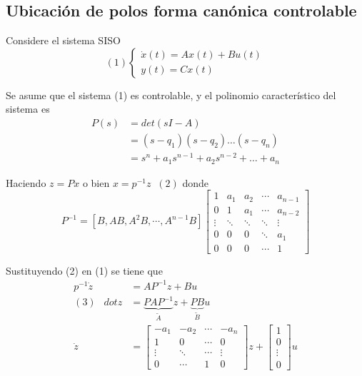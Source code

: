 \subsection{Ubicación de polos forma canónica controlable}

Considere el sistema SISO
\[(1)
    \left\{
        \begin{array}{lll}
            \dot{x}(t) = Ax(t) + Bu(t) \\
            y(t) = Cx(t)
        \end{array}
    \right.
\]

Se asume que el sistema (1) es controlable, y el polinomio característico del sistema es 
\[
    \begin{split}
        P(s) & = det(sI-A) \\
        & = (s-q_{1}) ( s-q_{2}) \ldots (s-q_{n}) \\
        & = s^{n} + a_{1}s^{n-1} + a_{2}s^{n-2} + \ldots + a_{n}
    \end{split}
\]

Haciendo \( z = Px \) o bien \( x=p^{-1}z \;\; (2) \) donde 
\[
    P^{-1} =
    [B, AB, A^{2}B, \cdots, A^{n-1}B ]
    \begin{bmatrix}
        1 & a_{1} & a_{2} & \cdots & a_{n-1} \\
        0 & 1 & a_{1} & \cdots & a_{n-2} \\
        \vdots & \ddots & \ddots & \ddots & \vdots \\
        0 & 0 & 0 & \ddots & a_{1} \\
        0 & 0 & 0 & \cdots & 1
    \end{bmatrix}
\]

Sustituyendo (2) en (1) se tiene que
\[
    \begin{split}
        p^{-1}\dot{z} & = AP^{-1}z + Bu \\
        (3) \;\;\ dot{z} & = 
        \underbrace{ PAP^{-1} }_{ \tilde{A} }
        z + 
        \underbrace{ PB }_{ \tilde{B} }u \\
        \dot{z} & = 
        \begin{bmatrix}
            -a_{1} & -a_{2} & \cdots & -a_{n} \\
            1 & 0 & \cdots & 0 \\
            \vdots & \ddots & \cdots & \vdots \\
            0 & \cdots & 1 & 0
        \end{bmatrix} z
        +
        \begin{bmatrix}
            1 \\ 0 \\ \vdots \\ 0
        \end{bmatrix} u
    \end{split}
\]

